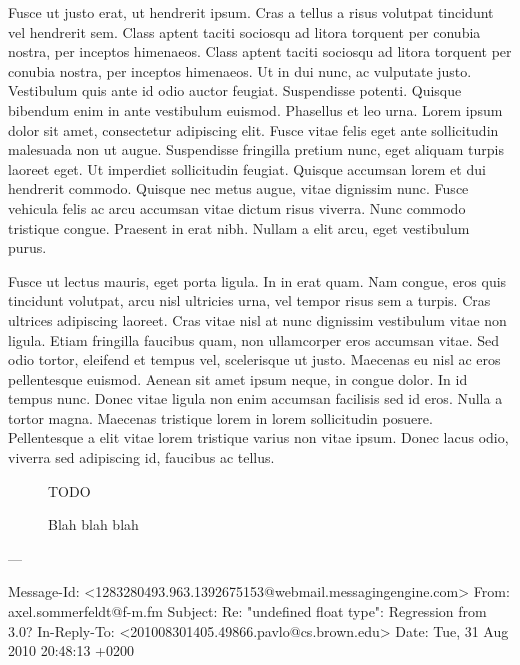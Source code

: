 Fusce ut justo erat, ut hendrerit ipsum. Cras a tellus a risus volutpat tincidunt vel hendrerit sem. Class aptent taciti sociosqu ad litora torquent per conubia nostra, per inceptos himenaeos. Class aptent taciti sociosqu ad litora torquent per conubia nostra, per inceptos himenaeos. Ut in dui nunc, ac vulputate justo. Vestibulum quis ante id odio auctor feugiat. Suspendisse potenti. Quisque bibendum enim in ante vestibulum euismod. Phasellus et leo urna. Lorem ipsum dolor sit amet, consectetur adipiscing elit. Fusce vitae felis eget ante sollicitudin malesuada non ut augue. Suspendisse fringilla pretium nunc, eget aliquam turpis laoreet eget. Ut imperdiet sollicitudin feugiat. Quisque accumsan lorem et dui hendrerit commodo. Quisque nec metus augue, vitae dignissim nunc. Fusce vehicula felis ac arcu accumsan vitae dictum risus viverra. Nunc commodo tristique congue. Praesent in erat nibh. Nullam a elit arcu, eget vestibulum purus.

Fusce ut lectus mauris, eget porta ligula. In in erat quam. Nam congue, eros quis tincidunt volutpat, arcu nisl ultricies urna, vel tempor risus sem a turpis. Cras ultrices adipiscing laoreet. Cras vitae nisl at nunc dignissim vestibulum vitae non ligula. Etiam fringilla faucibus quam, non ullamcorper eros accumsan vitae. Sed odio tortor, eleifend et tempus vel, scelerisque ut justo. Maecenas eu nisl ac eros pellentesque euismod. Aenean sit amet ipsum neque, in congue dolor. In id tempus nunc. Donec vitae ligula non enim accumsan facilisis sed id eros. Nulla a tortor magna. Maecenas tristique lorem in lorem sollicitudin posuere. Pellentesque a elit vitae lorem tristique varius non vitae ipsum. Donec lacus odio, viverra sed adipiscing id, faucibus ac tellus.

\begin{figure}[t!]
    \centering
    \begin{boxedminipage}{\columnwidth}
        \vspace{1.5in}
        TODO
    \end{boxedminipage}
   \caption{Blah blah blah}
\end{figure}



\iffalse

---

Message-Id: <1283280493.963.1392675153@webmail.messagingengine.com>
From: axel.sommerfeldt@f-m.fm
Subject: Re: "undefined float type": Regression from 3.0?
In-Reply-To: <201008301405.49866.pavlo@cs.brown.edu>
Date: Tue, 31 Aug 2010 20:48:13 +0200


